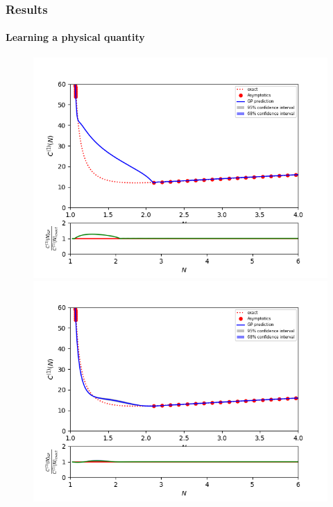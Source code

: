 \documentclass[aspectratio=43]{beamer}
\begin{document}
\begin{frame}

	\frametitle{Results}
	\framesubtitle{Learning a physical quantity}
	
	\begin{figure}
		\includegraphics[width = \linewidth]{plots/nlo_test_rquad.png}
		\endminipage\hfill
		\includegraphics[width = \linewidth]{plots/nlo_test_matern.png}
		\endminipage\hfill

\end{figure}
\end{frame}
\end{document}
